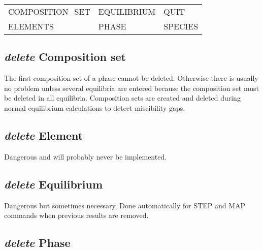\documentclass[12pt]{article}
\begin{document}
\begin{tabular}{lll}
 COMPOSITION\_SET & EQUILIBRIUM &     QUIT\\
 ELEMENTS         & PHASE        &    SPECIES\\
\end{tabular}

\subsection{{\em delete} Composition set}

The first composition set of a phase cannot be deleted.  Otherwise
there is usually no problem unless several equilibria are entered
because the composition set must be deleted in all equilibria.
Composition sets are created and deleted during normal equilibrium
calculations to detect miscibility gaps.

\subsection{{\em delete} Element}

Dangerous and will probably never be implemented.

\subsection{{\em delete} Equilibrium}

Dangerous but sometimes necessary.  Done automatically for STEP and
MAP commands when previous results are removed.

\subsection{{\em delete} Phase}
\end{document}
